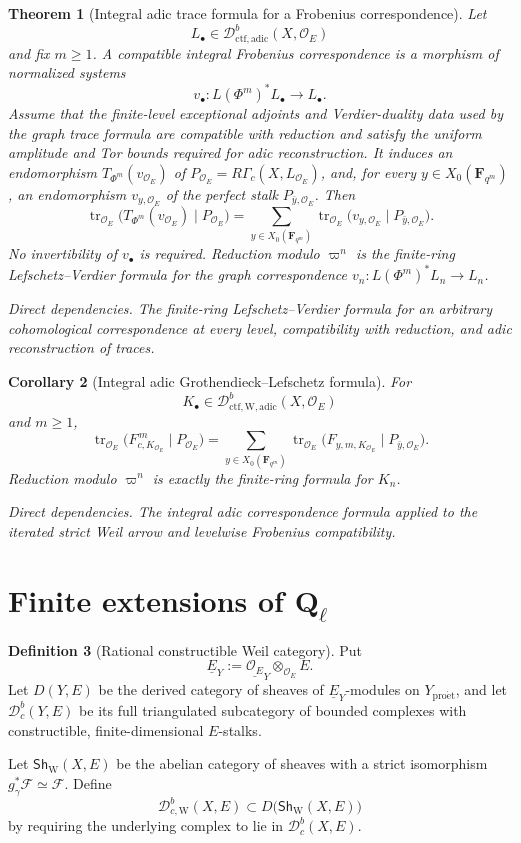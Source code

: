 \documentclass[10pt]{article}
\newtheorem{theorem}{Theorem}[section]
\newtheorem{corollary}[theorem]{Corollary}
\theoremstyle{definition}
\newtheorem{definition}[theorem]{Definition}
\newcommand{\Ql}{\mathbf Q_\ell}
\newcommand{\OO}{\mathcal O}
\newcommand{\Dbc}{\mathcal D^b_c}
\newcommand{\DbcW}{\mathcal D^b_{c,\mathrm W}}
\newcommand{\RGammac}{R\Gamma_c}
\newcommand{\depends}[1]{\par\smallskip\noindent\textit{Direct dependencies.} #1\par}
\begin{document}
\begin{theorem}[Integral adic trace formula for a Frobenius correspondence]
Let
\[
 L_\bullet\in
 \mathcal D^b_{\mathrm{ctf,adic}}(X,\OO_E)
\]
and fix \(m\geq1\).  A compatible integral Frobenius correspondence is a
morphism of normalized systems
\[
 v_\bullet:L(\Phi^m)^*L_\bullet\longrightarrow L_\bullet.
\]
Assume that the finite-level exceptional adjoints and Verdier-duality data
used by the graph trace formula are compatible with reduction and satisfy
the uniform amplitude and Tor bounds required for adic reconstruction.
It induces an endomorphism
\(T_{\Phi^m}(v_{\OO_E})\) of
\(P_{\OO_E}=\RGammac(X,L_{\OO_E})\), and, for every
\(y\in X_0(\mathbf F_{q^m})\), an endomorphism
\(v_{y,\OO_E}\) of the perfect stalk
\(P_{\bar y,\OO_E}\).  Then
\[
 \operatorname{tr}_{\OO_E}
 \bigl(T_{\Phi^m}(v_{\OO_E})\mid P_{\OO_E}\bigr)
 =
 \sum_{y\in X_0(\mathbf F_{q^m})}
 \operatorname{tr}_{\OO_E}
 \bigl(v_{y,\OO_E}\mid P_{\bar y,\OO_E}\bigr).
\]
No invertibility of \(v_\bullet\) is required.  Reduction modulo
\(\varpi^n\) is the finite-ring Lefschetz--Verdier formula for the graph
correspondence \(v_n:L(\Phi^m)^*L_n\to L_n\).
\depends{The finite-ring Lefschetz--Verdier formula for an arbitrary
cohomological correspondence at every level, compatibility with reduction,
and adic reconstruction of traces.}
\end{theorem}

\begin{corollary}[Integral adic Grothendieck--Lefschetz formula]
For
\[
 K_\bullet\in
 \mathcal D^b_{\mathrm{ctf,W,adic}}(X,\OO_E)
\]
and \(m\geq1\),
\[
 \operatorname{tr}_{\OO_E}
 \bigl(F_{c,K_{\OO_E}}^{\,m}\mid P_{\OO_E}\bigr)
 =
 \sum_{y\in X_0(\mathbf F_{q^m})}
 \operatorname{tr}_{\OO_E}
 \bigl(F_{y,m,K_{\OO_E}}\mid P_{\bar y,\OO_E}\bigr).
\]
Reduction modulo \(\varpi^n\) is exactly the finite-ring formula for
\(K_n\).
\depends{The integral adic correspondence formula applied to the iterated
strict Weil arrow and levelwise Frobenius compatibility.}
\end{corollary}

\section{Finite extensions of \texorpdfstring{\(\Ql\)}{Qell}}

\begin{definition}[Rational constructible Weil category]
Put
\[
 \underline E_Y:=\underline{\OO_E}_Y\otimes_{\OO_E}E.
\]
Let \(D(Y,E)\) be the derived category of sheaves of
\(\underline E_Y\)-modules on \(Y_{\mathrm{pro\acute et}}\), and let
\(\Dbc(Y,E)\) be its full triangulated subcategory of bounded complexes with
constructible, finite-dimensional \(E\)-stalks.

Let \(\mathsf{Sh}_{\mathrm W}(X,E)\) be the abelian category of sheaves
with a strict isomorphism \(g_\gamma^*\mathcal F\simeq\mathcal F\).
Define
\[
 \DbcW(X,E)\subset
 D\bigl(\mathsf{Sh}_{\mathrm W}(X,E)\bigr)
\]
by requiring the underlying complex to lie in \(\Dbc(X,E)\).
\end{definition}
\end{document}
